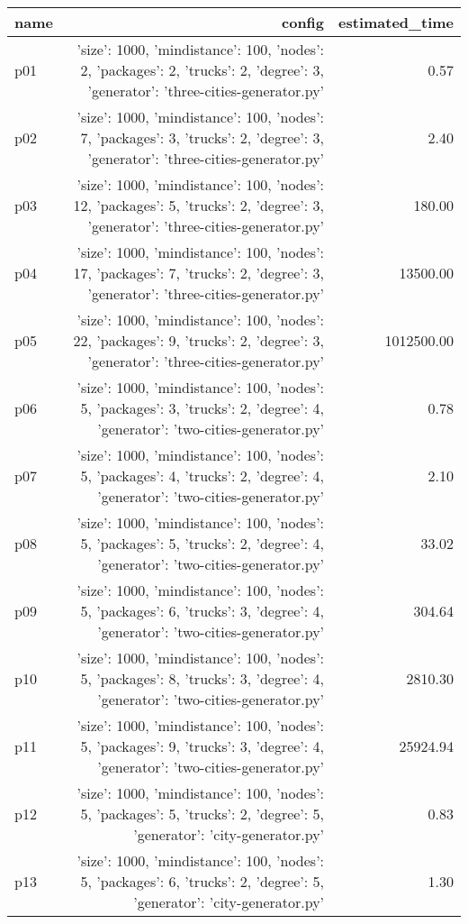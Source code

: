 \documentclass{article}
\begin{document}
                            \begin{center}
                            \scriptsize
                            \begin{tabular}{@{}l|r|r@{}}
                            name & config & estimated\_time\\\midrule
                              p01&{'size': 1000, 'mindistance': 100, 'nodes': 2, 'packages': 2, 'trucks': 2, 'degree': 3, 'generator': 'three-cities-generator.py'}&0.57\\
  p02&{'size': 1000, 'mindistance': 100, 'nodes': 7, 'packages': 3, 'trucks': 2, 'degree': 3, 'generator': 'three-cities-generator.py'}&2.40\\
  p03&{'size': 1000, 'mindistance': 100, 'nodes': 12, 'packages': 5, 'trucks': 2, 'degree': 3, 'generator': 'three-cities-generator.py'}&180.00\\
  p04&{'size': 1000, 'mindistance': 100, 'nodes': 17, 'packages': 7, 'trucks': 2, 'degree': 3, 'generator': 'three-cities-generator.py'}&13500.00\\
  p05&{'size': 1000, 'mindistance': 100, 'nodes': 22, 'packages': 9, 'trucks': 2, 'degree': 3, 'generator': 'three-cities-generator.py'}&1012500.00\\
  p06&{'size': 1000, 'mindistance': 100, 'nodes': 5, 'packages': 3, 'trucks': 2, 'degree': 4, 'generator': 'two-cities-generator.py'}&0.78\\
  p07&{'size': 1000, 'mindistance': 100, 'nodes': 5, 'packages': 4, 'trucks': 2, 'degree': 4, 'generator': 'two-cities-generator.py'}&2.10\\
  p08&{'size': 1000, 'mindistance': 100, 'nodes': 5, 'packages': 5, 'trucks': 2, 'degree': 4, 'generator': 'two-cities-generator.py'}&33.02\\
  p09&{'size': 1000, 'mindistance': 100, 'nodes': 5, 'packages': 6, 'trucks': 3, 'degree': 4, 'generator': 'two-cities-generator.py'}&304.64\\
  p10&{'size': 1000, 'mindistance': 100, 'nodes': 5, 'packages': 8, 'trucks': 3, 'degree': 4, 'generator': 'two-cities-generator.py'}&2810.30\\
  p11&{'size': 1000, 'mindistance': 100, 'nodes': 5, 'packages': 9, 'trucks': 3, 'degree': 4, 'generator': 'two-cities-generator.py'}&25924.94\\
  p12&{'size': 1000, 'mindistance': 100, 'nodes': 5, 'packages': 5, 'trucks': 2, 'degree': 5, 'generator': 'city-generator.py'}&0.83\\
  p13&{'size': 1000, 'mindistance': 100, 'nodes': 5, 'packages': 6, 'trucks': 2, 'degree': 5, 'generator': 'city-generator.py'}&1.30\\

\end{tabular}
\end{center}
\end{document}
